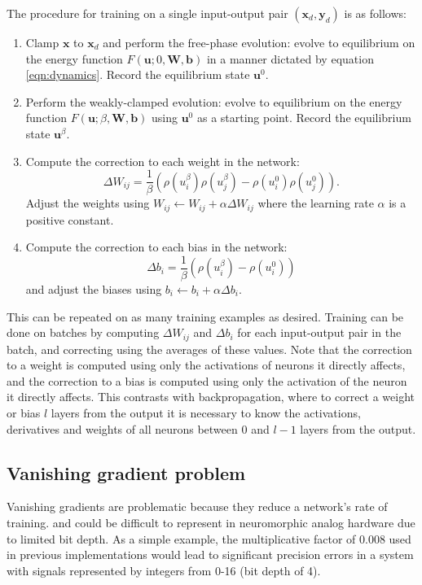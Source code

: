 \documentclass[utf8]{frontiersSCNS}
\newcommand{\mtx}[1]{\bm{#1}}
\begin{document}
The procedure for training on a single input-output pair $(\mtx{x}_d,\mtx{y}_d)$ is as follows:
\begin{enumerate}
\item Clamp $\mtx{x}$ to $\mtx{x}_d$ and perform the free-phase evolution: evolve to equilibrium on the energy function $F(\mtx{u}; 0, \mtx{W}, \mtx{b})$ in a manner dictated by equation \ref{eqn:dynamics}. Record the equilibrium state $\mtx{u}^0$.
\item Perform the weakly-clamped evolution: evolve to equilibrium on the energy function $F(\mtx{u}; \beta, \mtx{W}, \mtx{b})$ using $\mtx{u}^0$ as a starting point. Record the equilibrium state $\mtx{u}^{\beta}$.
\item Compute the correction to each weight in the network: 
\begin{equation}
\Delta W_{ij}=\frac{1}{\beta}(\rho(u_i^\beta)\rho(u_j^\beta)-\rho(u_i^0)\rho(u_j^0)). \label{eqn:weight_correction}
\end{equation}
Adjust the weights using $W_{ij}\leftarrow W_{ij}+\alpha\Delta W_{ij}$ where the learning rate $\alpha$ is a positive constant.
\item Compute the correction to each bias in the network:
\begin{equation}
\Delta b_i=\frac{1}{\beta}(\rho(u_i^{\beta})-\rho(u_i^0)) \label{eqn:bias_correction}
\end{equation}
and adjust the biases using $b_i\leftarrow b_i+\alpha\Delta b_i$.
\end{enumerate}
This can be repeated on as many training examples as desired. Training can be done on batches by computing $\Delta W_{ij}$ and $\Delta b_i$ for each input-output pair in the batch, and correcting using the averages of these values. Note that the correction to a weight is computed using only the activations of neurons it directly affects, and the correction to a bias is computed using only the activation of the neuron it directly affects. This contrasts with backpropagation, where to correct a weight or bias $l$ layers from the output it is necessary to know the activations, derivatives and weights of all neurons between $0$ and $l-1$ layers from the output.

\subsection{Vanishing gradient problem}
\label{sec:vangrad}

Vanishing gradients are problematic because they reduce a network's rate of training. and could be difficult to represent in neuromorphic analog hardware due to limited bit depth. As a simple example, the multiplicative factor of 0.008 used in previous implementations would lead to significant precision errors in a system with signals represented by integers from 0-16 (bit depth of 4).
\end{document}
